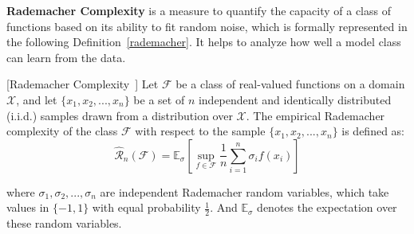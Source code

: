 \textbf{Rademacher Complexity} is a measure to quantify the capacity of a class of functions based on its ability to fit random noise, which is formally represented in the following Definition~\ref {rademacher}. It helps to analyze how well a model class can learn from the data.


\begin{definition}\label{rademacher}
    
[Rademacher Complexity~\citep{bartlett2002rademacher}]
    Let \( \mathcal{F} \) be a class of real-valued functions on a domain \( \mathcal{X} \), and let \( \{x_1, x_2, ..., x_n\} \) be a set of \( n \) independent and identically distributed (i.i.d.) samples drawn from a distribution over \( \mathcal{X} \). The empirical Rademacher complexity of the class \( \mathcal{F} \) with respect to the sample \( \{x_1, x_2, ..., x_n\} \) is defined as:
\[
\hat{\mathcal{R}}_n(\mathcal{F}) = \mathbb{E}_{\sigma} \left[ \sup_{f \in \mathcal{F}} \frac{1}{n} \sum_{i=1}^n \sigma_i f(x_i) \right]
\]
\end{definition}


where \( \sigma_1, \sigma_2, ..., \sigma_n \) are independent Rademacher random variables, which take values in \( \{-1, 1\} \) with equal probability \( \frac{1}{2} \).
And \( \mathbb{E}_{\sigma} \) denotes the expectation over these random variables.


